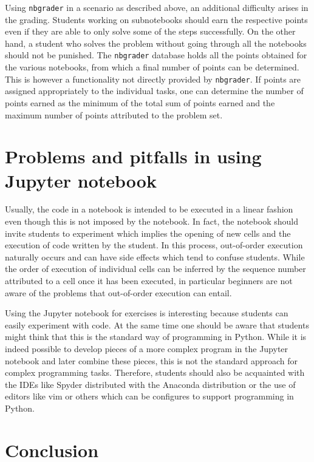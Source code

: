 \documentclass[twocolumn]{svjour3}          %
\begin{document}
Using \texttt{nbgrader} in a scenario as described above, an additional
difficulty arises in the grading. Students working on subnotebooks should earn
the respective points even if they are able to only solve some of the steps
successfully. On the other hand, a student who solves the problem without going
through all the notebooks should not be punished. The \texttt{nbgrader}
database holds all the points obtained for the various notebooks, from which a
final number of points can be determined. This is however a functionality not
directly provided by \texttt{nbgrader}. If points are assigned appropriately to
the individual tasks, one can determine the number of points earned as the
minimum of the total sum of points earned and the maximum number of points
attributed to the problem set.


\section{Problems and pitfalls in using Jupyter notebook}
Usually, the code in a notebook is intended to be executed in a linear
fashion even though this is not imposed by the notebook. In fact, the
notebook should invite students to experiment which implies the
opening of new cells and the execution of code written by the
student. In this process, out-of-order execution naturally occurs and
can have side effects which tend to confuse students. While the order
of execution of individual cells can be inferred by the sequence
number attributed to a cell once it has been executed, in particular
beginners are not aware of the problems that out-of-order execution
can entail.


Using the Jupyter notebook for exercises is interesting because
students can easily experiment with code. At the same time one should
be aware that students might think that this is the standard way of
programming in Python. While it is indeed possible to develop pieces
of a more complex program in the Jupyter notebook and later combine
these pieces, this is not the standard approach for complex
programming tasks. Therefore, students should also be acquainted with
the IDEs like Spyder distributed with the Anaconda distribution or the
use of editors like vim or others which can be configures to support
programming in Python.


\section{Conclusion}
\end{document}
